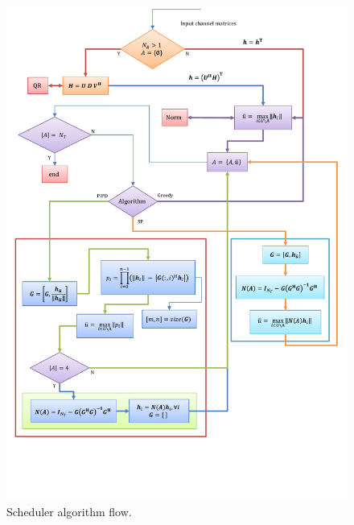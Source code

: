 \documentclass[conference,letterpaper,9pt]{./../IEEEtran}
\begin{document}
\begin{figure}
	\centering
	\includegraphics[trim=0in 1.5in 0in 0.0in,width=\columnwidth, angle=0]{Algorithm_Model}
	\caption{Scheduler algorithm flow.}
	\label{kuva:scheduler_block_diag}
	\vspace{-0.1in}
\end{figure}
\end{document}
